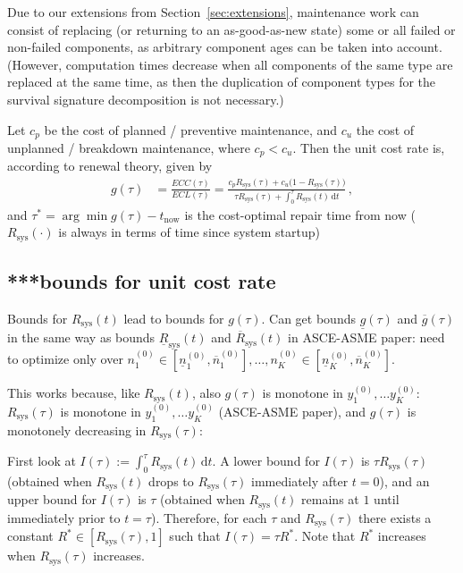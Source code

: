 \documentclass[authoryear]{elsarticle}
\newcommand{\dd}{\,\mathrm{d}}
\newcommand{\uz}{^{(0)}} %
\newcommand{\ul}[1]{\underline{#1}}
\newcommand{\ol}[1]{\overline{#1}}
\newcommand{\Rsys}{R_\text{sys}}
\newcommand{\lRsys}{\ul{R}_\text{sys}}
\newcommand{\uRsys}{\ol{R}_\text{sys}}
\newcommand{\lgt}{\ul{g}}
\newcommand{\ugt}{\ol{g}}
\newcommand{\ykzfun}[1]{y\uz_{#1}}
\newcommand{\nkzfun}[1]{n\uz_{#1}}
\newcommand{\nkzlfun}[1]{\ul{n}\uz_{#1}}
\newcommand{\nkzufun}[1]{\ol{n}\uz_{#1}}
\def\tnow{t_\text{now}}
\begin{document}
Due to our extensions from Section~\ref{sec:extensions},
maintenance work can consist of replacing (or returning to an as-good-as-new state) some or all failed or non-failed components,
as arbitrary component ages can be taken into account.
(However, computation times decrease when all components of the same type are replaced at the same time,
as then the duplication of component types for the survival signature decomposition is not necessary.)

Let $c_p$ be the cost of planned / preventive maintenance, and $c_u$ the cost of unplanned / breakdown maintenance, where $c_p < c_u$.
Then the unit cost rate is, according to renewal theory, given by
\begin{align}
g(\tau) &= \frac{ECC(\tau)}{ECL(\tau)} = \frac{c_p \Rsys(\tau) + c_u \big(1-\Rsys(\tau)\big)}{\tau \Rsys(\tau) + \int_0^\tau \Rsys(t) \dd t}\,,
\end{align}
and $\tau^* = \arg\min g(\tau) - \tnow$ is the cost-optimal repair time from now
($\Rsys(\cdot)$ is always in terms of time since system startup)


\subsection{***bounds for unit cost rate}

Bounds for $\Rsys(t)$ lead to bounds for $g(\tau)$.
Can get bounds $\lgt(\tau)$ and $\ugt(\tau)$ in the same way as bounds $\lRsys(t)$ and $\uRsys(t)$ in ASCE-ASME paper:
need to optimize only over
$\nkzfun{1} \in \left[\nkzlfun{1}, \nkzufun{1}\right], \ldots, \nkzfun{K} \in \left[\nkzlfun{K}, \nkzufun{K}\right]$.

This works because, like $\Rsys(t)$, also $g(\tau)$ is monotone in $\ykzfun{1}, \ldots \ykzfun{K}$:
$\Rsys(\tau)$ is monotone in $\ykzfun{1}, \ldots \ykzfun{K}$ (ASCE-ASME paper),
and $g(\tau)$ is monotonely decreasing in $\Rsys(\tau)$:

First look at $I(\tau) := \int_0^\tau \Rsys(t) \dd t$.
A lower bound for $I(\tau)$ is $\tau \Rsys(\tau)$ (obtained when $\Rsys(t)$ drops to $\Rsys(\tau)$ immediately after $t=0$),
and an upper bound for $I(\tau)$ is $\tau$ (obtained when $\Rsys(t)$ remains at $1$ until immediately prior to $t = \tau$).
Therefore, for each $\tau$ and $\Rsys(\tau)$ there exists a constant $R^* \in [\Rsys(\tau), 1]$
such that $I(\tau) = \tau R^*$.
Note that $R^*$ increases when $\Rsys(\tau)$ increases.
\end{document}
